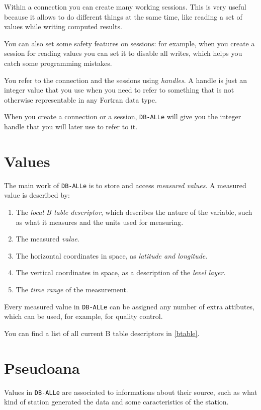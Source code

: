 \documentclass[final,12pt,a4paper,twoside]{book}
\newcommand{\dballe}{{\tt DB-ALLe}}
\begin{document}
Within a connection you can create many working sessions.  This is very useful
because it allows to do different things at the same time, like reading a set
of values while writing computed results.

You can also set some safety features on sessions: for example, when you create
a session for reading values you can set it to disable all writes, which helps
you catch some programming mistakes.

You refer to the connection and the sessions using \emph{handles}.  A handle is
just an integer value that you use when you need to refer to something that is
not otherwise representable in any Fortran data type.

When you create a connection or a session, \dballe{} will give you the integer
handle that you will later use to refer to it.

\section {Values}

The main work of \dballe{} is to store and access \emph{measured values}.  A
measured value is described by:

\begin{enumerate}
\item The \emph{local B table descriptor}, which describes the nature of the
      variable, such as what it measures and the units used for measuring.
\item The measured \emph{value}.
\item The horizontal coordinates in space, as \emph{latitude and longitude}.
\item The vertical coordinates in space, as a description of the \emph{level layer}.
\item The \emph{time range} of the measurement.
\end{enumerate}

Every measured value in \dballe{} can be assigned any number of extra
attibutes, which can be used, for example, for quality control.

You can find a list of all current B table descriptors in \ref{btable}.

\section {Pseudoana}

Values in \dballe{} are associated to informations about their source, such as
what kind of station generated the data and some caracteristics of the station.
\end{document}

